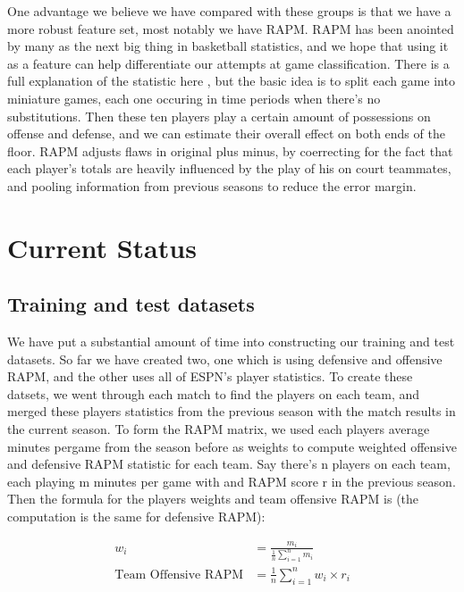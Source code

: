 \documentclass{article}
\begin{document}
	One advantage we believe we have compared with these groups is that we have a more robust feature set, most notably we have RAPM. RAPM has been anointed by many as the next big thing \cite{bigrpm} in basketball statistics, and we hope that using it as a feature can help differentiate our attempts at game classification. There is a full explanation of the statistic here \cite{rpm}, but the basic idea is to split each game into miniature games, each one occuring in time periods when there's no substitutions. Then these ten players play a certain amount of possessions on offense and defense, and we can estimate their overall effect on both ends of the floor. RAPM adjusts flaws in original plus minus, by coerrecting for the fact that each player's totals are heavily influenced by the play of his on court teammates, and pooling information from previous seasons to reduce the error margin. 

\section{Current Status}
	\subsection{Training and test datasets}
	We have put a substantial amount of time into constructing our training and test datasets. So far we have created two, one which is using defensive and offensive RAPM, and the other uses all of ESPN's player statistics. To create these datsets, we went through each match to find the players on each team, and merged these players statistics from the previous season with the match results in the current season. To form the RAPM matrix, we used each players average minutes pergame from the season before as weights to compute weighted offensive and defensive RAPM statistic for each team. Say there's n players on each team, each playing m minutes per game with and RAPM score r in the previous season. Then the formula for the players weights and team offensive RAPM is (the computation is the same for defensive RAPM):

	\begin{align*}
		w_i &= \frac{m_i}{\frac{1}{n}\sum_{i=1}^{n} m_i} \\
		\text{Team Offensive RAPM} &= \frac{1}{n}\sum_{i=1}^{n} w_i \times r_i 
	\end{align*}
\end{document}
